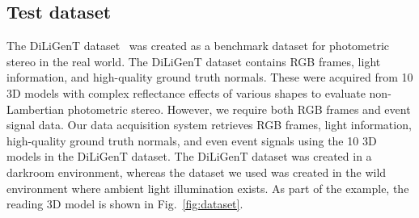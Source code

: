 \subsection{Test dataset}
The DiLiGenT dataset~\citep{shi2016benchmark} was created as a benchmark dataset for photometric stereo in the real world. The DiLiGenT dataset contains RGB frames, light information, and high-quality ground truth normals. These were acquired from 10 3D models with complex reflectance effects of various shapes to evaluate non-Lambertian photometric stereo. However, we require both RGB frames and event signal data. Our data acquisition system retrieves RGB frames, light information, high-quality ground truth normals, and even event signals using the 10 3D models in the DiLiGenT dataset. The DiLiGenT dataset was created in a darkroom environment, whereas the dataset we used was created in the wild environment where ambient light illumination exists. As part of the example, the reading 3D model is shown in Fig.~\ref{fig:dataset}.